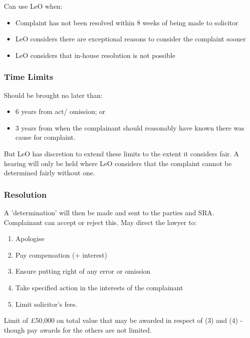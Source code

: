 \documentclass[
]{article}
\providecommand{\tightlist}{%
  \setlength{\itemsep}{0pt}\setlength{\parskip}{0pt}}
\begin{document}
Can use LeO when:

\begin{itemize}
\tightlist
\item
  Complaint has not been resolved within 8 weeks of being made to
  solicitor
\item
  LeO considers there are exceptional reasons to consider the complaint
  sooner
\item
  LeO considers that in-house resolution is not possible
\end{itemize}

\hypertarget{time-limits}{%
\subsubsection{Time Limits}\label{time-limits}}

Should be brought no later than:

\begin{itemize}
\tightlist
\item
  6 years from act/ omission; or
\item
  3 years from when the complainant should reasonably have known there
  was cause for complaint.
\end{itemize}

But LeO has discretion to extend these limits to the extent it considers
fair. A hearing will only be held where LeO considers that the complaint
cannot be determined fairly without one.

\hypertarget{resolution}{%
\subsubsection{Resolution}\label{resolution}}

A 'determination' will then be made and sent to the parties and SRA.
Complainant can accept or reject this. May direct the lawyer to:

\begin{enumerate}
\tightlist
\item
  Apologise
\item
  Pay compensation (+ interest)
\item
  Ensure putting right of any error or omission
\item
  Take specified action in the interests of the complainant
\item
  Limit solicitor's fees.
\end{enumerate}

Limit of £50,000 on total value that may be awarded in respect of (3)
and (4) - though pay awards for the others are not limited.
\end{document}
